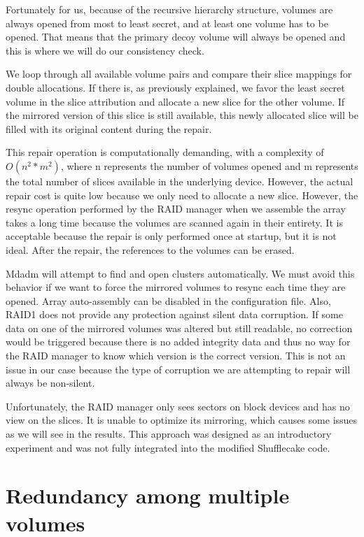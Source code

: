 \documentclass[a4paper,11pt,oneside]{report}
\begin{document}
Fortunately for us, because of the recursive hierarchy structure, volumes are always opened from most to least secret, and at least one volume has to be opened. That means that the primary decoy volume will always be opened and this is where we will do our consistency check.

We loop through all available volume pairs and compare their slice mappings for double allocations. If there is, as previously explained, we favor the least secret volume in the slice attribution and allocate a new slice for the other volume. If the mirrored version of this slice is still available, this newly allocated slice will be filled with its original content during the repair.

This repair operation is computationally demanding, with a complexity of \( O(n^2 * m^2) \), where n represents the number of volumes opened and m represents the total number of slices available in the underlying device. However, the actual repair cost is quite low because we only need to allocate a new slice. However, the resync operation performed by the RAID manager when we assemble the array takes a long time because the volumes are scanned again in their entirety. It is acceptable because the repair is only performed once at startup, but it is not ideal. After the repair, the references to the volumes can be erased.

Mdadm will attempt to find and open clusters automatically. We must avoid this behavior if we want to force the mirrored volumes to resync each time they are opened. Array auto-assembly can be disabled in the configuration file. Also, RAID1 does not provide any protection against silent data corruption. If some data on one of the mirrored volumes was altered but still readable, no correction would be triggered because there is no added integrity data and thus no way for the RAID manager to know which version is the correct version. This is not an issue in our case because the type of corruption we are attempting to repair will always be non-silent.

Unfortunately, the RAID manager only sees sectors on block devices and has no view on the slices. It is unable to optimize its mirroring, which causes some issues as we will see in the results. This approach was designed as an introductory experiment and was not fully integrated into the modified Shufflecake code.

\section{Redundancy among multiple volumes}
\end{document}
